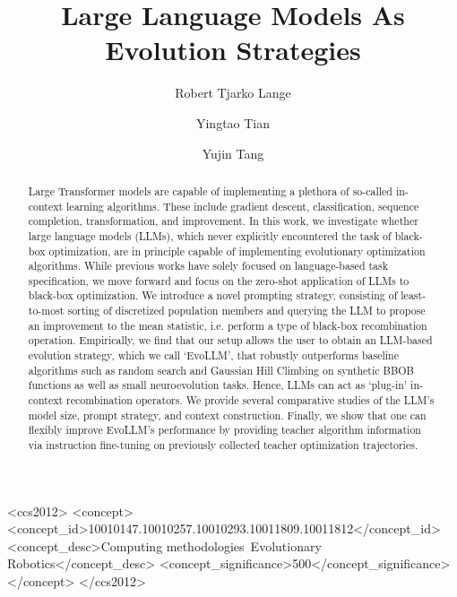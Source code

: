 \documentclass[sigconf]{acmart}
\begin{document}
\title{Large Language Models As Evolution Strategies}
\author{Robert Tjarko Lange}
\author{Yingtao Tian}
\author{Yujin Tang}
\renewcommand{\shortauthors}{Lange et al.}
\begin{abstract}
Large Transformer models are capable of implementing a plethora of so-called in-context learning algorithms.
These include gradient descent, classification, sequence completion, transformation, and improvement.
In this work, we investigate whether large language models (LLMs), which never explicitly encountered the task of black-box optimization, are in principle capable of implementing evolutionary optimization algorithms.
While previous works have solely focused on language-based task specification, we move forward and focus on the zero-shot application of LLMs to black-box optimization. We introduce a novel prompting strategy, consisting of least-to-most sorting of discretized population members and querying the LLM to propose an improvement to the mean statistic, i.e. perform a type of black-box recombination operation.
Empirically, we find that our setup allows the user to obtain an LLM-based evolution strategy, which we call `EvoLLM', that robustly outperforms baseline algorithms such as random search and Gaussian Hill Climbing on synthetic BBOB functions as well as small neuroevolution tasks.
Hence, LLMs can act as `plug-in' in-context recombination operators.
We provide several comparative studies of the LLM's model size, prompt strategy, and context construction.
Finally, we show that one can flexibly improve EvoLLM's performance by providing teacher algorithm information via instruction fine-tuning on previously collected teacher optimization trajectories.
\end{abstract}
\begin{CCSXML}
<ccs2012>
    <concept>
        <concept_id>10010147.10010257.10010293.10011809.10011812</concept_id>
        <concept_desc>Computing methodologies~Evolutionary Robotics</concept_desc>
        <concept_significance>500</concept_significance>
    </concept>
</ccs2012>
\end{CCSXML}
\end{document}
